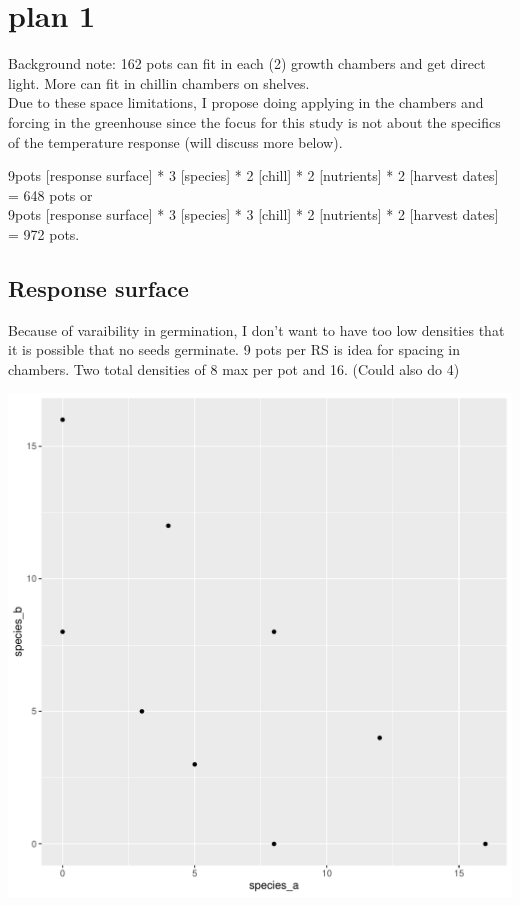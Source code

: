 \documentclass{article}\usepackage[]{graphicx}\usepackage[]{color}
\makeatletter
\def\maxwidth{ %
  \ifdim\Gin@nat@width>\linewidth
    \linewidth
  \else
    \Gin@nat@width
  \fi
}
\newenvironment{knitrout}{}{} %
\makeatother
\begin{document}
\section*{plan 1}
Background note: 162 pots can fit in each (2) growth chambers and get direct light. More can fit in chillin chambers on shelves.\\
Due to these space limitations, I propose doing applying in the chambers and forcing in the greenhouse since the focus for this study is not about the specifics of the temperature response (will discuss more below).

9pots [response surface] * 3 [species] * 2 [chill] * 2 [nutrients] * 2 [harvest dates] = 648 pots or\\
9pots [response surface] * 3 [species] * 3 [chill] * 2 [nutrients] * 2 [harvest dates] = 972 pots.

\subsection{Response surface}
Because of varaibility in germination, I don't want to have too low densities that it is possible that no seeds germinate. 9 pots per RS is idea for spacing in chambers. Two total densities of 8 max per pot and 16. (Could also do 4)

\begin{knitrout}
\color{fgcolor}
\includegraphics[width=\maxwidth]{figure/unnamed-chunk-1-1} 

\end{knitrout}
\end{document}
